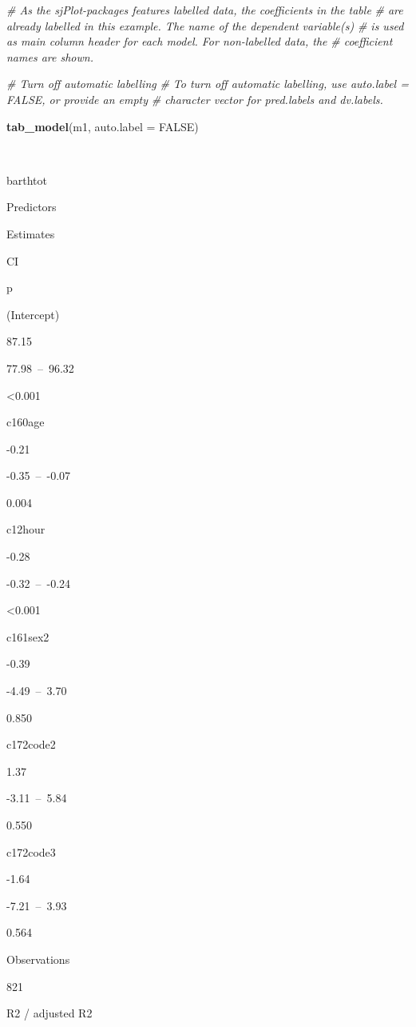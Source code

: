 \documentclass[]{article}
\newenvironment{Shaded}{\begin{snugshade}}{\end{snugshade}}
\newcommand{\KeywordTok}[1]{\textcolor[rgb]{0.13,0.29,0.53}{\textbf{#1}}}
\newcommand{\DataTypeTok}[1]{\textcolor[rgb]{0.13,0.29,0.53}{#1}}
\newcommand{\CommentTok}[1]{\textcolor[rgb]{0.56,0.35,0.01}{\textit{#1}}}
\newcommand{\OtherTok}[1]{\textcolor[rgb]{0.56,0.35,0.01}{#1}}
\newcommand{\NormalTok}[1]{#1}
\begin{document}
\begin{Shaded}
\begin{Highlighting}[]
\CommentTok{# As the sjPlot-packages features labelled data, the coefficients in the table}
\CommentTok{# are already labelled in this example. The name of the dependent variable(s) }
\CommentTok{# is used as main column header for each model. For non-labelled data, the }
\CommentTok{# coefficient names are shown.}

\CommentTok{# Turn off automatic labelling}
\CommentTok{# To turn off automatic labelling, use auto.label = FALSE, or provide an empty}
\CommentTok{# character vector for pred.labels and dv.labels.}

\KeywordTok{tab_model}\NormalTok{(m1, }\DataTypeTok{auto.label =} \OtherTok{FALSE}\NormalTok{)}
\end{Highlighting}
\end{Shaded}

~

barthtot

Predictors

Estimates

CI

p

(Intercept)

87.15

77.98~--~96.32

\textless{}0.001

c160age

-0.21

-0.35~--~-0.07

0.004

c12hour

-0.28

-0.32~--~-0.24

\textless{}0.001

c161sex2

-0.39

-4.49~--~3.70

0.850

c172code2

1.37

-3.11~--~5.84

0.550

c172code3

-1.64

-7.21~--~3.93

0.564

Observations

821

R2 / adjusted R2
\end{document}
